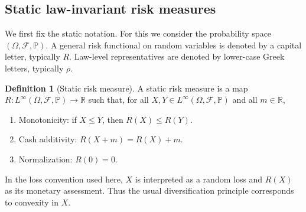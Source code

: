 \documentclass[a4paper]{amsart}
\theoremstyle{definition}
\newtheorem{definition}[definition]{Definition}
\newcommand{\R}{\mathbb{R}}
\newcommand{\F}{\mathcal{F}}
\renewcommand{\P}{\mathbb{P}}
\begin{document}
\subsection{Static law-invariant risk measures}

We first fix the static notation. 
For this we consider the probability space \((\Omega,\F,\P)\). 
A general risk functional on random variables is
denoted by a capital letter, typically \(R\). Law-level representatives are
denoted by lower-case Greek letters, typically \(\rho\).

\begin{definition}[Static risk measure]
\label{def:static-risk-measure}
A static risk measure is a map \(R:L^\infty(\Omega,\F,\P)\to\R\) such that,
for all \(X,Y\in L^\infty(\Omega,\F,\P)\) and all \(m\in\R\),

\begin{enumerate}[(1)]
\item Monotonicity: if \(X\le Y\), then \(R(X)\le R(Y)\).

\item Cash additivity: \(R(X+m)=R(X)+m\).

\item Normalization: \(R(0)=0\).
\end{enumerate}
\end{definition}

In the loss convention used here, \(X\) is interpreted as a random loss and
\(R(X)\) as its monetary assessment. Thus the usual diversification principle
corresponds to convexity in \(X\).
\end{document}
